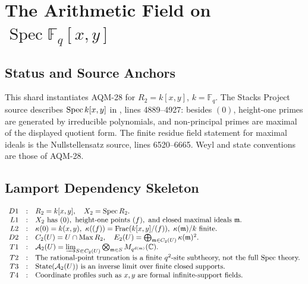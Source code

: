 
\section{The Arithmetic Field on \texorpdfstring{\(\operatorname{Spec}\mathbb F_q[x,y]\)}{Spec Fq[x,y]}}
\label{sec:spec-fq-xy-arithmetic-field}

\subsection{Status and Source Anchors}

This shard instantiates AQM-28 for \(R_2=k[x,y]\), \(k=\mathbb F_q\).  The
Stacks Project source describes \(\operatorname{Spec} k[x,y]\) in
, lines
4889--4927: besides \((0)\), height-one primes are generated by irreducible
polynomials, and non-principal primes are maximal of the displayed quotient
form.  The finite residue field statement for maximal ideals is the
Nullstellensatz source, lines 6520--6665.  Weyl and state conventions are
those of AQM-28.

\subsection{Lamport Dependency Skeleton}

\[
\begin{array}{rcl}
D1&:&R_2=k[x,y],\quad X_2=\operatorname{Spec} R_2.\\
L1&:&X_2\text{ has }(0),\text{ height-one points }(f),\text{ and
      closed maximal ideals }\mathfrak m.\\
L2&:&\kappa(0)=k(x,y),\
      \kappa((f))=\operatorname{Frac}(k[x,y]/(f)),\
      \kappa(\mathfrak m)/k\text{ finite}.\\
D2&:&C_2(U)=U\cap\operatorname{Max}R_2,\quad
      E_2(U)=\bigoplus_{\mathfrak m\in C_2(U)}\kappa(\mathfrak m)^2.\\
T1&:&\mathcal A_2(U)=
      \varinjlim_{S\Subset C_2(U)}
      \bigotimes_{\mathfrak m\in S}M_{q^{d(\mathfrak m)}}(\mathbb C).\\
T2&:&\text{The rational-point truncation is a finite }q^2\text{-site
      subtheory, not the full Spec theory.}\\
T3&:&\operatorname{State}(\mathcal A_2(U))\text{ is an inverse limit over
      finite closed supports.}\\
T4&:&\text{Coordinate profiles such as }x,y\text{ are formal
      infinite-support fields.}
\end{array}
\]


